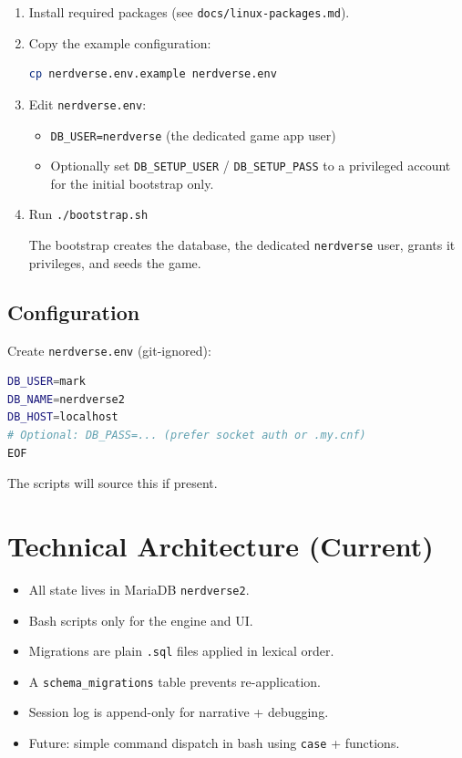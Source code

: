 \documentclass[11pt,a4paper]{article}
\begin{document}
\begin{enumerate}
  \item Install required packages (see \texttt{docs/linux-packages.md}).
  \item Copy the example configuration:
    \begin{lstlisting}[language=bash]
cp nerdverse.env.example nerdverse.env
    \end{lstlisting}
  \item Edit \texttt{nerdverse.env}:
    \begin{itemize}
      \item \texttt{DB\_USER=nerdverse} (the dedicated game app user)
      \item Optionally set \texttt{DB\_SETUP\_USER} / \texttt{DB\_SETUP\_PASS} to a privileged account for the initial bootstrap only.
    \end{itemize}
  \item Run \texttt{./bootstrap.sh}

  The bootstrap creates the database, the dedicated \texttt{nerdverse} user, grants it privileges, and seeds the game.
\end{enumerate}

\subsection{Configuration}

Create \texttt{nerdverse.env} (git-ignored):

\begin{lstlisting}[language=bash]
DB_USER=mark
DB_NAME=nerdverse2
DB_HOST=localhost
# Optional: DB_PASS=... (prefer socket auth or .my.cnf)
EOF
\end{lstlisting}

The scripts will source this if present.

\section{Technical Architecture (Current)}

\begin{itemize}
  \item All state lives in MariaDB \texttt{nerdverse2}.
  \item Bash scripts only for the engine and UI.
  \item Migrations are plain \texttt{.sql} files applied in lexical order.
  \item A \texttt{schema\_migrations} table prevents re-application.
  \item Session log is append-only for narrative + debugging.
  \item Future: simple command dispatch in bash using \texttt{case} + functions.
\end{itemize}
\end{document}
